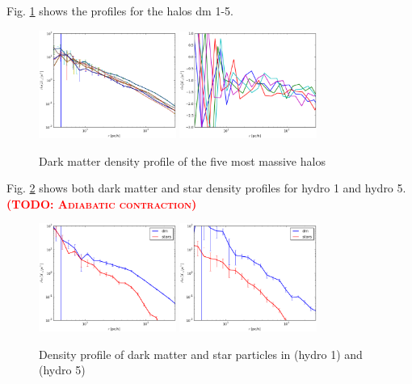 \documentclass[useAMS,usenatbib]{mn2e}
\newcommand{\TODO}[1]{\textsc{\textbf{\textcolor{red}{(TODO: #1)}}}}
\begin{document}
Fig. \ref{fig:prof_dmonly} shows the profiles for the halos {\sc dm 1-5}.
\begin{figure}
  \begin{center}
    \includegraphics[width=0.4\textwidth]{fig/prof_dmonly.eps}
    \includegraphics[width=0.4\textwidth]{fig/dlnrhodm_all.eps}
  \end{center}
  \caption{\label{fig:prof_dmonly}Dark matter density profile of the five most massive halos}
\end{figure}

Fig. \ref{fig:star_prof} shows both dark matter and star density profiles for {\sc hydro 1} and {\sc hydro 5}. \TODO{Adiabatic contraction}
\begin{figure}
  \begin{center}
    \includegraphics[width=0.4\textwidth]{fig/map_dm_stars_1.eps}
    \includegraphics[width=0.4\textwidth]{fig/map_dm_stars_5.eps}
  \end{center}
  \caption{\label{fig:star_prof}Density profile of dark matter and star particles in ({\sc hydro 1}) and ({\sc hydro 5})}
\end{figure}
\end{document}
